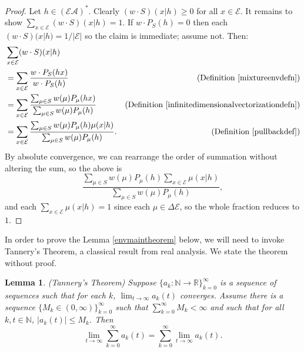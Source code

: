\documentclass[twoside]{article}
\newtheorem{lemma}[theorem]{Lemma}
\begin{document}
\begin{proof}
    Let $h\in(\mathcal E\mathcal A)^*$.
    Clearly $(w\cdot S)(x|h)\geq 0$ for all $x\in\mathcal E$.
    It remains to show $\sum_{x\in\mathcal E}(w\cdot S)(x|h)=1$.
    If $w\cdot P_{S}(h)=0$ then each $(w\cdot S)(x|h)=1/|\mathcal E|$
    so the claim is immediate; assume not. Then:
    \begin{align*}
        &{} \sum_{x\in\mathcal E}(w\cdot S)(x|h)\\
            &= \sum_{x\in\mathcal E}\frac{w\cdot P_{S}(hx)}{w\cdot P_{S}(h)}
                &\mbox{(Definition \ref{mixtureenvdefn})}\\
            &= \sum_{x\in\mathcal E}
                \frac{
                    \sum_{\mu\in S}w(\mu)P_\mu(hx)
                }{
                    \sum_{\mu\in S}w(\mu)P_\mu(h)
                }
                &\mbox{(Definition \ref{infinitedimensionalvectorizationdefn})}\\
            &= \sum_{x\in\mathcal E}
                \frac{
                    \sum_{\mu\in S}w(\mu)P_\mu(h)\mu(x|h)
                }{
                    \sum_{\mu\in S}w(\mu)P_\mu(h)
                }.
                &\mbox{(Definition \ref{pullbackdef})}
    \end{align*}
    By absolute convergence, we can rearrange the order of summation without
    altering the sum, so the above is
    \[
        \frac{
            \sum_{\mu\in S}w(\mu)P_\mu(h)\sum_{x\in\mathcal E}\mu(x|h)
        }{
            \sum_{\mu\in S}w(\mu)P_\mu(h)
        },
    \]
    and each $\sum_{x\in\mathcal E}\mu(x|h)=1$ since each $\mu\in\Delta\mathcal E$,
    so the whole fraction reduces to $1$.
\end{proof}

In order to prove the Lemma \ref{envmaintheorem} below, we will need to invoke
Tannery's Theorem, a classical result from real analysis. We state the theorem
without proof.

\begin{lemma}
\label{tannerysthm}
    (Tannery's Theorem)
    Suppose $\{a_k:\mathbb N\to\mathbb R\}_{k=0}^\infty$ is a sequence of sequences
    such that for each $k$, $\lim_{t\to\infty}a_k(t)$ converges.
    Assume there is a sequence $\{M_k\in (0,\infty)\}_{k=0}^\infty$
    such that $\sum_{k=0}^\infty M_k<\infty$ and such that for all $k,t\in\mathbb N$,
    $|a_k(t)|\leq M_k$. Then
    \[
        \lim_{t\to\infty}\sum_{k=0}^\infty a_k(t)
        =
        \sum_{k=0}^\infty\lim_{t\to\infty} a_k(t).
    \]
\end{lemma}
\end{document}
